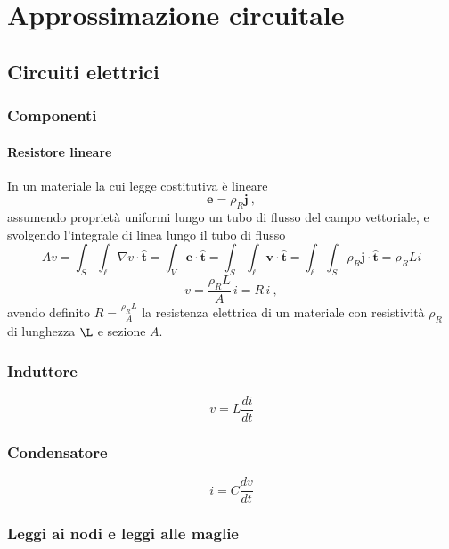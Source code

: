 \chapter{Approssimazione circuitale}

\section{Circuiti elettrici}
\subsection{Componenti}
\subsubsection{Resistore lineare}
In un materiale la cui legge costitutiva è lineare
\begin{equation}
    \mathbf{e} = \rho_R \mathbf{j} \ ,
\end{equation}
assumendo proprietà uniformi lungo un tubo di flusso del campo vettoriale, e svolgendo l'integrale di linea lungo il tubo di flusso
\begin{equation}
   A v = \int_S \int_\ell \nabla v \cdot \mathbf{\hat{t}} = \int_{V} \mathbf{e} \cdot \mathbf{\hat{t}} = \int_{S} \int_{\ell} \mathbf{v} \cdot \mathbf{\hat{t}} = \int_{\ell}  \int_{S} \rho_R \mathbf{j} \cdot \mathbf{\hat{t}} = \rho_R L i
\end{equation}
\begin{equation}
    v = \dfrac{\rho_R L}{A} \, i = R \, i \ ,
\end{equation}
avendo definito $R = \frac{\rho_R L}{A}$ la resistenza elettrica di un materiale con resistività $\rho_R$ di lunghezza $\L$ e sezione $A$.

\subsection{Induttore}
\begin{equation}
    v = L \dfrac{di}{dt}
\end{equation}

\subsection{Condensatore}
\begin{equation}
    i = C \dfrac{d v}{dt}
\end{equation}

\subsection{Leggi ai nodi e leggi alle maglie}
